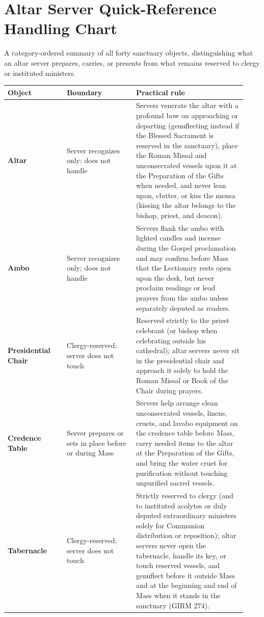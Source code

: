 \clearpage
\section{Altar Server Quick-Reference Handling Chart}
A category-ordered summary of all forty sanctuary objects, distinguishing what an altar server prepares, carries, or presents from what remains reserved to clergy or instituted ministers.

{\footnotesize\begin{longtable}{>{\raggedright\arraybackslash}p{0.23\linewidth}>{\raggedright\arraybackslash}p{0.27\linewidth}>{\raggedright\arraybackslash}p{0.43\linewidth}}
\toprule
\textbf{Object} & \textbf{Boundary} & \textbf{Practical rule} \\
\midrule
\endhead
\textbf{Altar} & Server recognizes only; does not handle & Servers venerate the altar with a profound bow on approaching or departing (genuflecting instead if the Blessed Sacrament is reserved in the sanctuary), place the Roman Missal and unconsecrated vessels upon it at the Preparation of the Gifts when needed, and never lean upon, clutter, or kiss the mensa (kissing the altar belongs to the bishop, priest, and deacon). \\
\textbf{Ambo} & Server recognizes only; does not handle & Servers flank the ambo with lighted candles and incense during the Gospel proclamation and may confirm before Mass that the Lectionary rests open upon the desk, but never proclaim readings or lead prayers from the ambo unless separately deputed as readers. \\
\textbf{Presidential Chair} & Clergy-reserved; server does not touch & Reserved strictly to the priest celebrant (or bishop when celebrating outside his cathedral); altar servers never sit in the presidential chair and approach it solely to hold the Roman Missal or Book of the Chair during prayers. \\
\textbf{Credence Table} & Server prepares or sets in place before or during Mass & Servers help arrange clean unconsecrated vessels, linens, cruets, and lavabo equipment on the credence table before Mass, carry needed items to the altar at the Preparation of the Gifts, and bring the water cruet for purification without touching unpurified sacred vessels. \\
\textbf{Tabernacle} & Clergy-reserved; server does not touch & Strictly reserved to clergy (and to instituted acolytes or duly deputed extraordinary ministers solely for Communion distribution or reposition); altar servers never open the tabernacle, handle its key, or touch reserved vessels, and genuflect before it outside Mass and at the beginning and end of Mass when it stands in the sanctuary (GIRM 274). \\

\end{longtable}}
